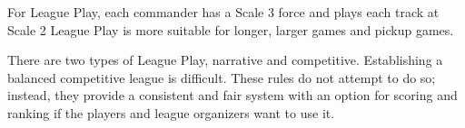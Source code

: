 For League Play, each commander has a Scale 3 force and plays each track at Scale 2
League Play is more suitable for longer, larger games and pickup games.

There are two types of League Play, narrative and competitive.
Establishing a balanced competitive league is difficult.
These rules do not attempt to do so; instead, they provide a consistent and fair system with an option for scoring and ranking if the players and league organizers want to use it.

